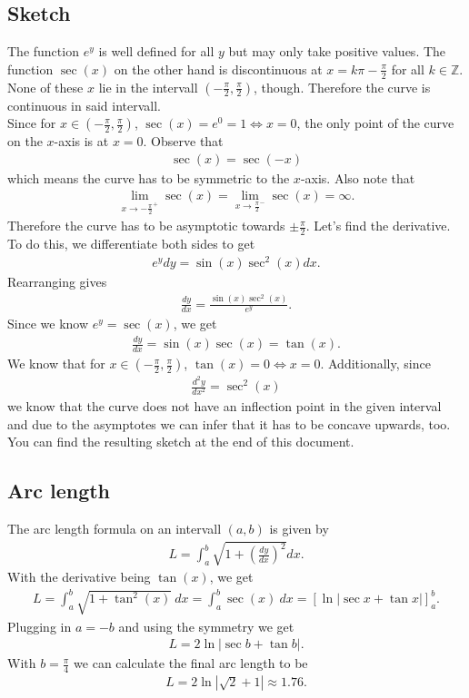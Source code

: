 \documentclass{article}
\newcommand{\Z}{\mathbb{Z}}
\begin{document}
\subsection*{Sketch}
The function $e^y$ is well defined for all $y$ but may only take positive values.
The function $\sec(x)$ on the other hand is discontinuous at $x=k\pi-\frac{\pi}{2}$ for all $k\in\Z$. 
None of these $x$ lie in the intervall $(-\frac{\pi}{2}, \frac{\pi}{2})$, though.
Therefore the curve is continuous in said intervall.\\
Since for $x\in(-\frac{\pi}{2}, \frac{\pi}{2})$, $\sec(x)=e^0=1\Leftrightarrow x=0$, the only point of the curve on the $x$-axis is at $x=0$.
Observe that
\begin{align*}
  \sec(x)=\sec(-x)
\end{align*}
which means the curve has to be symmetric to the $x$-axis. Also note that
\begin{align*}
  \lim_{x\to -\frac{\pi}{2}^+} \sec(x) = \lim_{x\to \frac{\pi}{2}^-} \sec(x) = \infty.
\end{align*}
Therefore the curve has to be asymptotic towards $\pm\frac{\pi}{2}$. Let's find the derivative. To do this, we differentiate both sides to get
\begin{align*}
  e^ydy = \sin(x)\sec^2(x)dx.
\end{align*}
Rearranging gives
\begin{align*}
  \frac{dy}{dx}=\frac{\sin(x)\sec^2(x)}{e^y}.
\end{align*}
Since we know $e^y=\sec(x)$, we get
\begin{align*}
  \frac{dy}{dx}=\sin(x)\sec(x)=\tan(x).
\end{align*}
We know that for $x\in(-\frac{\pi}{2}, \frac{\pi}{2})$, $\tan(x)=0\Leftrightarrow x = 0$. Additionally, since
\begin{align*}
  \frac{d^2y}{dx^2}=\sec^2(x)
\end{align*}
we know that the curve does not have an inflection point in the given interval and due to the asymptotes we can infer that it has to be concave upwards, too. You can find the resulting sketch at the end of this document.
\subsection*{Arc length}
The arc length formula on an intervall $(a,b)$ is given by
\begin{align*}
  L=\int_a^b \sqrt{1+\left(\frac{dy}{dx}\right)^2}dx.
\end{align*}
With the derivative being $\tan(x)$, we get
\begin{align*}
  L=\int_a^b \sqrt{1+\tan^2(x)}\:dx=\int_a^b \sec(x)\:dx=\left[\ln\left|\sec x + \tan x\right|\right]_a^b.
\end{align*}
Plugging in $a=-b$ and using the symmetry we get
\begin{align*}
  L=2\ln\left|\sec b + \tan b\right|.
\end{align*}
With $b=\frac{\pi}{4}$ we can calculate the final arc length to be
\begin{align*}
  L = 2\ln\left|\sqrt{2}+1\right|\approx 1.76.
\end{align*}
\end{document}
